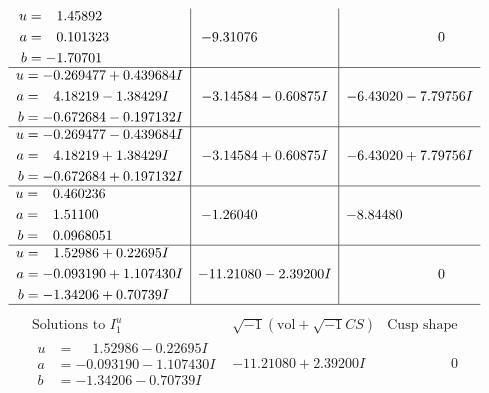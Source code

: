 \documentclass[1p]{elsarticle_modified}
\theoremstyle{definition}
\newcommand{\I}{\sqrt{-1}}
\begin{document}
$$\begin{array}{c|c|c}
\begin{aligned}
u &= \phantom{-}1.45892\phantom{ +0.000000I} \\
a &= \phantom{-}0.101323\phantom{ +0.000000I} \\
b &= -1.70701\phantom{ +0.000000I}\end{aligned}
 & -9.31076\phantom{ +0.000000I} & \phantom{-0.000000 } 0 \\ \hline\begin{aligned}
u &= -0.269477 + 0.439684 I \\
a &= \phantom{-}4.18219 - 1.38429 I \\
b &= -0.672684 - 0.197132 I\end{aligned}
 & -3.14584 - 0.60875 I & -6.43020 - 7.79756 I \\ \hline\begin{aligned}
u &= -0.269477 - 0.439684 I \\
a &= \phantom{-}4.18219 + 1.38429 I \\
b &= -0.672684 + 0.197132 I\end{aligned}
 & -3.14584 + 0.60875 I & -6.43020 + 7.79756 I \\ \hline\begin{aligned}
u &= \phantom{-}0.460236\phantom{ +0.000000I} \\
a &= \phantom{-}1.51100\phantom{ +0.000000I} \\
b &= \phantom{-}0.0968051\phantom{ +0.000000I}\end{aligned}
 & -1.26040\phantom{ +0.000000I} & -8.84480\phantom{ +0.000000I} \\ \hline\begin{aligned}
u &= \phantom{-}1.52986 + 0.22695 I \\
a &= -0.093190 + 1.107430 I \\
b &= -1.34206 + 0.70739 I\end{aligned}
 & -11.21080 - 2.39200 I & \phantom{-0.000000 } 0\\
 \hline 
 \end{array}$$\newpage$$\begin{array}{c|c|c}  
\text{Solutions to }I^u_{1}& \I (\text{vol} + \sqrt{-1}CS) & \text{Cusp shape}\\
 \hline 
\begin{aligned}
u &= \phantom{-}1.52986 - 0.22695 I \\
a &= -0.093190 - 1.107430 I \\
b &= -1.34206 - 0.70739 I\end{aligned}
 & -11.21080 + 2.39200 I & \phantom{-0.000000 } 0 \\ \hline\begin{aligned}

\end{aligned}
\end{array}$$
\end{document}
